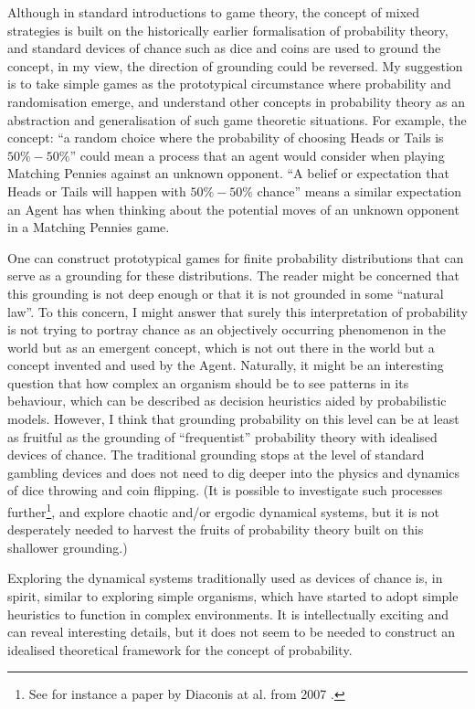\documentclass{article}
\begin{document}
Although in standard introductions to game theory, the concept of mixed strategies is built on the historically earlier formalisation of probability theory, and standard devices of chance such as dice and coins are used to ground the concept, in my view, the direction of grounding could be reversed.
My suggestion is to take simple games as the prototypical circumstance where probability and randomisation emerge, and understand other concepts in probability theory as an abstraction and generalisation of such game theoretic situations.
For example, the concept: ``a random choice where the probability of choosing Heads or Tails is $50\%-50\%$'' could mean a process that an agent would consider when playing Matching Pennies against an unknown opponent. ``A belief or expectation that Heads or Tails will happen with $50\%-50\%$ chance'' means a similar expectation an Agent has when thinking about the potential moves of an unknown opponent in a Matching Pennies game.

One can construct prototypical games for finite probability distributions that can serve as a grounding for these distributions.
The reader might be concerned that this grounding is not deep enough or that it is not grounded in some ``natural law''. To this concern, I might answer that surely this interpretation of probability is not trying to portray chance as an objectively occurring phenomenon in the world but as an emergent concept, which is not out there in the world but a concept invented and used by the Agent.
Naturally, it might be an interesting question that how complex an organism should be to see patterns in its behaviour, which can be described as decision heuristics aided by probabilistic models.
However, I think that grounding probability on this level can be at least as fruitful as the grounding of ``frequentist'' probability theory with idealised devices of chance. The traditional grounding stops at the level of standard gambling devices and does not need to dig deeper into the physics and dynamics of dice throwing and coin flipping. (It is possible to investigate such processes further\footnote{See for instance a paper by Diaconis at al. from 2007 \cite{paper:Diaconis2007}.}, and explore chaotic and/or ergodic dynamical systems, but it is not desperately needed to harvest the fruits of probability theory built on this shallower grounding.)

Exploring the dynamical systems traditionally used as devices of chance is, in spirit, similar to exploring simple organisms, which have started to adopt simple heuristics to function in complex environments. It is intellectually exciting and can reveal interesting details, but it does not seem to be needed to construct an idealised theoretical framework for the concept of probability.
\end{document}
